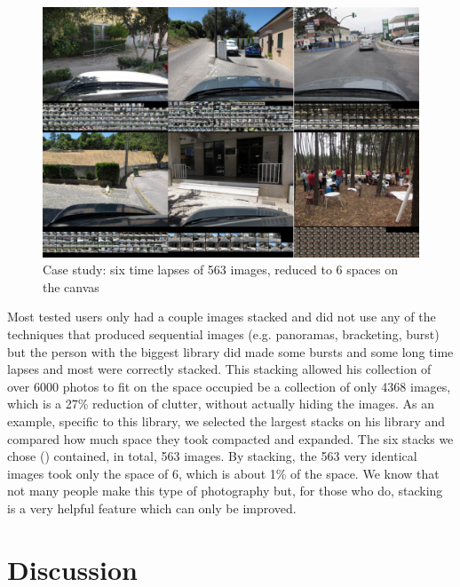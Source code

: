 \begin{figure}
	\vspace{-20pt}
	\begin{center}
		\includegraphics[width=\linewidth]{Figures/filcab-time-lapse-563-imgs-to-6.png}
	\end{center}
	\vspace{-20pt}
	\caption{Case study: six time lapses of 563 images, reduced to 6 spaces on the canvas}
	\vspace{-5pt}
	\label{fig:filcab:stacks}
\end{figure}

Most tested users only had a couple images stacked and did not use any of the techniques that produced sequential images (e.g. panoramas, bracketing, burst) but the person with the biggest library did made some bursts and some long time lapses and most were correctly stacked. This stacking allowed his collection of over 6000 photos to fit on the space occupied be a collection of only 4368 images, which is a 27\% reduction of clutter, without actually hiding the images. As an example, specific to this library, we selected the largest stacks on his library and compared how much space they took compacted and expanded. The six stacks we chose () contained, in total, 563 images. By stacking, the 563 very identical images took only the space of 6, which is about 1\% of the space. We know that not many people make this type of photography but, for those who do, stacking is a very helpful feature which can only be improved.






\section{Discussion}

